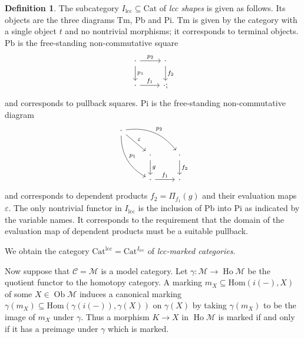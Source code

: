 \documentclass[a4paper]{article}
\theoremstyle{remark}
\theoremstyle{definition}
\newtheorem{definition}[theorem]{Definition}
\begin{document}
\begin{definition}
  The subcategory $I_\mathrm{lcc} \subseteq \mathrm{Cat}$ of \emph{lcc shapes} is given as follows.
  Its objects are the three diagrams $\mathrm{Tm}$, $\mathrm{Pb}$ and $\mathrm{Pi}$.
  $\mathrm{Tm}$ is given by the category with a single object $t$ and no nontrivial morphisms; it corresponds to terminal objects.
  $\mathrm{Pb}$ is the free-standing non-commutative square
  \begin{equation}
    \begin{tikzcd}
      \cdot \arrow[d, "p_1"] \arrow[r, "p_2"] & \cdot \arrow[d, "f_2"] \\
      \cdot \arrow[r, "f_1"] & \cdot;
    \end{tikzcd}
  \end{equation}
  and corresponds to pullback squares.
  $\mathrm{Pi}$ is the free-standing non-commutative diagram
  \begin{equation}
    \begin{tikzcd}
      \cdot \arrow[ddr, bend right, "p_1"] \arrow[drr, bend left, "p_2"] \arrow[dr, "\varepsilon"] \\
      & \cdot \arrow[d, "g"] & \cdot \arrow[d, "f_2"] \\
      & \cdot \arrow[r, "f_1"] & \cdot
    \end{tikzcd}
  \end{equation}
  and corresponds to dependent products $f_2 = \Pi_{f_1}(g)$ and their evaluation maps $\varepsilon$.
  The only nontrivial functor in $I_\mathrm{lcc}$ is the inclusion of $\mathrm{Pb}$ into $\mathrm{Pi}$ as indicated by the variable names.
  It corresponds to the requirement that the domain of the evaluation map of dependent products must be a suitable pullback.

  We obtain the category $\mathrm{Cat}^\mathrm{lcc} = \mathrm{Cat}^{I_\mathrm{lcc}}$ of \emph{lcc-marked categories}.
\end{definition}

Now suppose that $\mathcal{C} = \mathcal{M}$ is a model category.
Let $\gamma : \mathcal{M} \rightarrow \operatorname{Ho} \mathcal{M}$ be the quotient functor to the homotopy category.
A marking $m_X \subseteq \mathrm{Hom}(i(-), X)$ of some $X \in \operatorname{Ob} \mathcal{M}$ induces a canonical marking $\gamma(m_X) \subseteq \mathrm{Hom}(\gamma(i(-)), \gamma(X))$ on $\gamma(X)$ by taking $\gamma(m_X)$ to be the image of $m_X$ under $\gamma$.
Thus a morphism $K \rightarrow X$ in $\operatorname{Ho} \mathcal{M}$ is marked if and only if it has a preimage under $\gamma$ which is marked.
\end{document}
